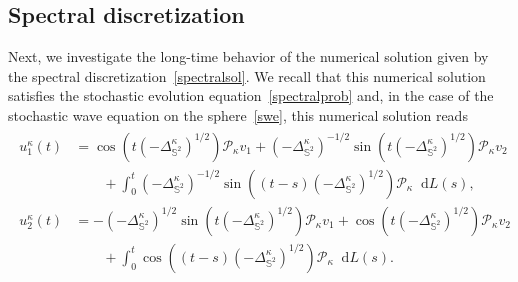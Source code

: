 \documentclass[11pt]{amsart}
\newcommand{\IS}{\mathbb{S}}
\newcommand*\dd{\mathop{}\!\mathrm{d}}
\newcommand{\Deltalb}{\Delta_{\IS^2}}
\newcommand{\cP}{\mathcal{P}}
\begin{document}
\subsection{Spectral discretization}
Next, we investigate the long-time behavior of the numerical solution given by the spectral discretization~\eqref{spectralsol}. We recall that this numerical solution satisfies the stochastic evolution equation~\eqref{spectralprob} and, 
in the case of the stochastic wave equation on the sphere~\eqref{swe}, this numerical solution reads
\begin{align}
\label{eqn:SWE_spectral}
\begin{split}
u_1^\kappa(t)&=\cos(t(-\Deltalb^\kappa)^{1/2})\cP_\kappa v_1+(-\Deltalb^\kappa)^{-1/2}\sin(t(-\Deltalb^\kappa)^{1/2})\cP_\kappa v_2\\
&\qquad+\int_0^t(-\Deltalb^\kappa)^{-1/2}\sin((t-s)(-\Deltalb^\kappa)^{1/2})\cP_\kappa\dd L(s),\\
u_2^\kappa(t)&=-(-\Deltalb^\kappa)^{1/2}\sin(t(-\Deltalb^\kappa)^{1/2})\cP_\kappa v_1+\cos(t(-\Deltalb^\kappa)^{1/2})\cP_\kappa v_2\\
&\qquad+\int_0^t\cos((t-s)(-\Deltalb^\kappa)^{1/2})\cP_\kappa\dd L(s).
\end{split}
\end{align}
\end{document}
